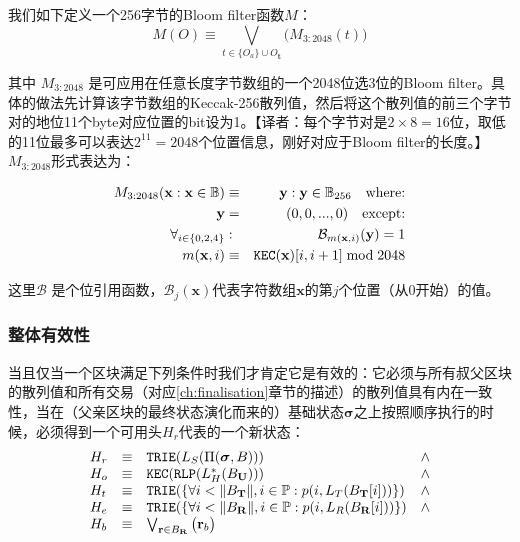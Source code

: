 \documentclass[UTF8,nofonts]{ctexart}
\begin{document}
\begin{multicols}{2}
我们如下定义一个256字节的Bloom filter函数$M$：
\begin{equation}
M(O) \equiv \bigvee_{t \in \{O_a\} \cup O_\mathbf{t}} \big( M_{3:2048}(t) \big)
\end{equation}

其中 $M_{3:2048}$ 是可应用在任意长度字节数组的一个2048位选3位的Bloom filter。具体的做法先计算该字节数组的Keccak-256散列值，然后将这个散列值的前三个字节对的地位11个byte对应位置的bit设为1。【译者：每个字节对是$2\times 8 = 16$位，取低的11位最多可以表达$2^{11} = 2048$个位置信息，刚好对应于Bloom filter的长度。】  $M_{3:2048}$形式表达为：

\begin{eqnarray}
M_{3:2048}(\mathbf{x}: \mathbf{x} \in \mathbb{B}) & \equiv & \mathbf{y}: \mathbf{y} \in \mathbb{B}_{256} \quad \text{where:}\\
\mathbf{y} & = & (0, 0, ..., 0) \quad \text{except:}\\
\forall_{i \in \{0, 2, 4\}}&:& \mathcal{B}_{m(\mathbf{x}, i)}(\mathbf{y}) = 1\\
m(\mathbf{x}, i) &\equiv& \mathtt{\tiny KEC}(\mathbf{x})[i, i + 1] \bmod 2048
\end{eqnarray}

这里$\mathcal{B}$ 是个位引用函数，$\mathcal{B}_j(\mathbf{x})$代表字符数组$\mathbf{x}$的第$j$个位置（从0开始）的值。

\subsubsection{整体有效性}

当且仅当一个区块满足下列条件时我们才肯定它是有效的：它必须与所有叔父区块的散列值和所有交易（对应\ref{ch:finalisation}章节的描述）的散列值具有内在一致性，当在（父亲区块的最终状态演化而来的）基础状态$\boldsymbol{\sigma}$之上按照顺序执行的时候，必须得到一个可用头$H_r$代表的一个新状态：
\begin{equation}
\begin{array}[t]{lclc}
H_r &\equiv& \mathtt{\small TRIE}(L_S(\Pi(\boldsymbol{\sigma}, B))) & \wedge \\
H_o &\equiv& \mathtt{\small KEC}(\mathtt{\small RLP}(L_H^*(B_\mathbf{U}))) & \wedge \\
H_t &\equiv& \mathtt{\small TRIE}(\{\forall i < \lVert B_\mathbf{T} \rVert, i \in \mathbb{P}: p(i, L_T(B_\mathbf{T}[i]))\}) & \wedge \\
H_e &\equiv& \mathtt{\small TRIE}(\{\forall i < \lVert B_\mathbf{R} \rVert, i \in \mathbb{P}: p(i, L_R(B_\mathbf{R}[i]))\}) & \wedge \\
H_b &\equiv& \bigvee_{\mathbf{r} \in B_\mathbf{R}} \big( \mathbf{r}_b \big)
\end{array}
\end{equation}


\end{multicols}
\end{document}
